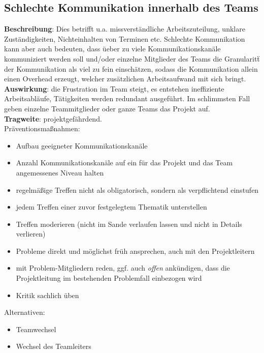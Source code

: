 \documentclass[a4paper, 12pt, titlepage]{scrartcl}
\begin{document}
	\subsection{Schlechte Kommunikation innerhalb des Teams}
		\textbf{Beschreibung}: Dies betrifft u.a. missverst\"andliche Arbeitszuteilung, unklare Zust\"andigkeiten, Nichteinhalten von Terminen etc. Schlechte Kommunikation kann aber auch bedeuten, dass \"ueber zu viele Kommunikationskan\"ale kommuniziert werden soll und/oder einzelne Mitglieder des Teams die Granularit\"t der Kommunikation als viel zu fein einsch\"atzen, sodass die Kommunikation allein einen Overhead erzeugt, welcher zus\"atzlichen Arbeitsaufwand mit sich bringt.\\
		\textbf{Auswirkung}: die Frustration im Team steigt, es entstehen ineffiziente Arbeitsabl\"aufe, T\"atigkeiten werden redundant ausgef\"uhrt. Im schlimmsten Fall geben einzelne Teammitglieder oder ganze Teams das Projekt auf.\\
		\textbf{Tragweite}: projektgef\"ahrdend.\\
		Pr\"aventionsma\ss nahmen:
			\begin{itemize}
				\item Aufbau geeigneter Kommunikationskan\"ale
				\item Anzahl Kommunikationskan\"ale auf ein f\"ur das Projekt und das Team angemessenes Niveau halten
				\item regelm\"a\ss ige Treffen nicht als obligatorisch, sondern als verpflichtend einstufen
				\item jedem Treffen einer zuvor festgelegtem Thematik unterstellen
				\item Treffen moderieren (nicht im Sande verlaufen lassen und nicht in Details verlieren)
				\item Probleme direkt und m\"oglichst fr\"uh ansprechen, auch mit den Projektleitern
				\item mit Problem-Mitgliedern reden, ggf. auch \emph{offen} ank\"undigen, dass die Projektleitung im bestehenden Problemfall einbezogen wird
				\item Kritik sachlich \"uben
			\end{itemize}
		Alternativen: 
			\begin{itemize}
				\item Teamwechsel
				\item Wechsel des Teamleiters
			\end{itemize}
\end{document}
